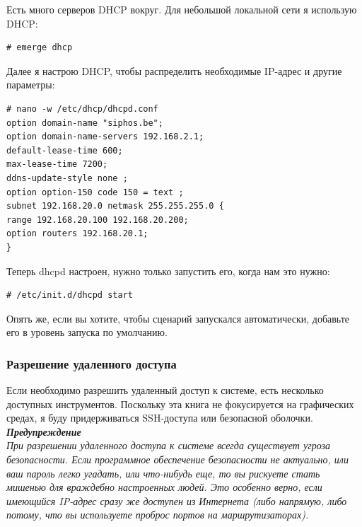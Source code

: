\documentclass[10pt]{book}
\begin{document}
Есть много серверов DHCP вокруг. Для небольшой локальной сети я использую DHCP:

\begin{tcolorbox}
\begin{lstlisting}
# emerge dhcp
\end{lstlisting}
\end{tcolorbox}

Далее я настрою DHCP, чтобы распределить необходимые IP-адрес и другие параметры:

\begin{tcolorbox}
\begin{lstlisting}
# nano -w /etc/dhcp/dhcpd.conf
option domain-name "siphos.be";
option domain-name-servers 192.168.2.1;
default-lease-time 600;
max-lease-time 7200;
ddns-update-style none ;
option option-150 code 150 = text ;
subnet 192.168.20.0 netmask 255.255.255.0 {
range 192.168.20.100 192.168.20.200;
option routers 192.168.20.1;
}
\end{lstlisting}
\end{tcolorbox}

Теперь dhcpd настроен, нужно только запустить его, когда нам это нужно:

\begin{tcolorbox}
\begin{lstlisting}
# /etc/init.d/dhcpd start
\end{lstlisting}
\end{tcolorbox}

Опять же, если вы хотите, чтобы сценарий запускался автоматически, добавьте его в уровень запуска по умолчанию.

\subsubsection{Разрешение удаленного доступа}

Если необходимо разрешить удаленный доступ к системе, есть несколько доступных инструментов. Поскольку эта книга не фокусируется на графических средах, я буду придерживаться SSH-доступа или безопасной оболочки.\\

\textit{\textbf{Предупреждение}\\
При разрешении удаленного доступа к системе всегда существует угроза безопасности. Если программное обеспечение безопасности не актуально, или ваш пароль легко угадать, или что-нибудь еще, то вы рискуете стать мишенью для враждебно настроенных людей. Это особенно верно, если имеющийся IP-адрес сразу же доступен из Интернета (либо напрямую, либо потому, что вы используете проброс портов на маршрутизаторах).}
\end{document}
